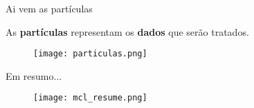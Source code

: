 


%
%                
%            
%   
%    


\begin{frame}[t]{Ai vem as partículas}

    As \textbf{partículas} representam os \textbf{dados} que serão tratados. 
    \begin{figure}

        \texttt{[image: particulas.png]}%
        
    
    \end{figure}
\end{frame}


\begin{frame}[t]{Em resumo...}

    
    \begin{figure}

        \texttt{[image: mcl\_resume.png]}%
        
    
    \end{figure}
\end{frame}

